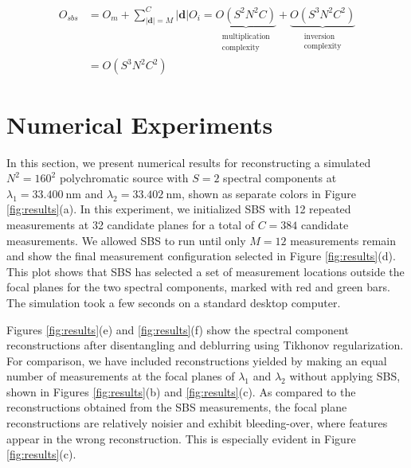 \documentclass{article}
\begin{document}
\vspace{-0.2 in}
\begin{align*}
  O_{sbs} &= O_m + \sum_{|\bm{d}| = M}^C |\bm{d}| O_i =
  \underbrace{
  O(S^2N^2C)
  }_{\substack{\text{multiplication}\\ \text{complexity}}}
  +
  \underbrace{
  O(S^3N^2C^2)
  }_{\substack{\text{inversion}\\ \text{complexity}}} \\
  &= O(S^3N^2C^2)
\end{align*}

\section{Numerical Experiments}
In this section, we present numerical results for reconstructing a simulated
$N^2{=}160^2$ polychromatic source with $S=2$ spectral components at $\lambda_1 =
\SI{33.400}{\nano\metre}$ and $\lambda_2 = \SI{33.402}{\nano\metre}$, shown as
separate colors in Figure \ref{fig:results}(a). In this experiment, we
initialized SBS with 12 repeated measurements at 32 candidate planes for a total
of $C = 384$ candidate measurements. We allowed SBS to run until only $M = 12$
measurements remain and show the final measurement configuration selected in
Figure \ref{fig:results}(d).  This plot shows that SBS has selected a set of
measurement locations outside the focal planes for the two spectral components,
marked with red and green bars. The simulation took a few seconds on a standard
desktop computer.

Figures \ref{fig:results}(e) and \ref{fig:results}(f) show the spectral
component reconstructions after disentangling and deblurring using Tikhonov
regularization. For comparison, we have included reconstructions yielded by
making an equal number of measurements at the focal planes of $\lambda_1$ and
$\lambda_2$ without applying SBS, shown in Figures \ref{fig:results}(b) and
\ref{fig:results}(c).  As compared to the reconstructions obtained from the SBS
measurements, the focal plane reconstructions are relatively noisier and exhibit
bleeding-over, where features appear in the wrong reconstruction.  This is
especially evident in Figure \ref{fig:results}(c).
\end{document}
